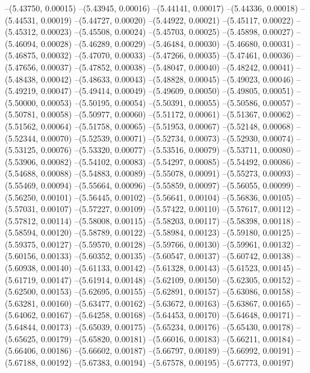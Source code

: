 --(5.43750, 0.00015)
--(5.43945, 0.00016)
--(5.44141, 0.00017)
--(5.44336, 0.00018)
--(5.44531, 0.00019)
--(5.44727, 0.00020)
--(5.44922, 0.00021)
--(5.45117, 0.00022)
--(5.45312, 0.00023)
--(5.45508, 0.00024)
--(5.45703, 0.00025)
--(5.45898, 0.00027)
--(5.46094, 0.00028)
--(5.46289, 0.00029)
--(5.46484, 0.00030)
--(5.46680, 0.00031)
--(5.46875, 0.00032)
--(5.47070, 0.00033)
--(5.47266, 0.00035)
--(5.47461, 0.00036)
--(5.47656, 0.00037)
--(5.47852, 0.00038)
--(5.48047, 0.00040)
--(5.48242, 0.00041)
--(5.48438, 0.00042)
--(5.48633, 0.00043)
--(5.48828, 0.00045)
--(5.49023, 0.00046)
--(5.49219, 0.00047)
--(5.49414, 0.00049)
--(5.49609, 0.00050)
--(5.49805, 0.00051)
--(5.50000, 0.00053)
--(5.50195, 0.00054)
--(5.50391, 0.00055)
--(5.50586, 0.00057)
--(5.50781, 0.00058)
--(5.50977, 0.00060)
--(5.51172, 0.00061)
--(5.51367, 0.00062)
--(5.51562, 0.00064)
--(5.51758, 0.00065)
--(5.51953, 0.00067)
--(5.52148, 0.00068)
--(5.52344, 0.00070)
--(5.52539, 0.00071)
--(5.52734, 0.00073)
--(5.52930, 0.00074)
--(5.53125, 0.00076)
--(5.53320, 0.00077)
--(5.53516, 0.00079)
--(5.53711, 0.00080)
--(5.53906, 0.00082)
--(5.54102, 0.00083)
--(5.54297, 0.00085)
--(5.54492, 0.00086)
--(5.54688, 0.00088)
--(5.54883, 0.00089)
--(5.55078, 0.00091)
--(5.55273, 0.00093)
--(5.55469, 0.00094)
--(5.55664, 0.00096)
--(5.55859, 0.00097)
--(5.56055, 0.00099)
--(5.56250, 0.00101)
--(5.56445, 0.00102)
--(5.56641, 0.00104)
--(5.56836, 0.00105)
--(5.57031, 0.00107)
--(5.57227, 0.00109)
--(5.57422, 0.00110)
--(5.57617, 0.00112)
--(5.57812, 0.00114)
--(5.58008, 0.00115)
--(5.58203, 0.00117)
--(5.58398, 0.00118)
--(5.58594, 0.00120)
--(5.58789, 0.00122)
--(5.58984, 0.00123)
--(5.59180, 0.00125)
--(5.59375, 0.00127)
--(5.59570, 0.00128)
--(5.59766, 0.00130)
--(5.59961, 0.00132)
--(5.60156, 0.00133)
--(5.60352, 0.00135)
--(5.60547, 0.00137)
--(5.60742, 0.00138)
--(5.60938, 0.00140)
--(5.61133, 0.00142)
--(5.61328, 0.00143)
--(5.61523, 0.00145)
--(5.61719, 0.00147)
--(5.61914, 0.00148)
--(5.62109, 0.00150)
--(5.62305, 0.00152)
--(5.62500, 0.00153)
--(5.62695, 0.00155)
--(5.62891, 0.00157)
--(5.63086, 0.00158)
--(5.63281, 0.00160)
--(5.63477, 0.00162)
--(5.63672, 0.00163)
--(5.63867, 0.00165)
--(5.64062, 0.00167)
--(5.64258, 0.00168)
--(5.64453, 0.00170)
--(5.64648, 0.00171)
--(5.64844, 0.00173)
--(5.65039, 0.00175)
--(5.65234, 0.00176)
--(5.65430, 0.00178)
--(5.65625, 0.00179)
--(5.65820, 0.00181)
--(5.66016, 0.00183)
--(5.66211, 0.00184)
--(5.66406, 0.00186)
--(5.66602, 0.00187)
--(5.66797, 0.00189)
--(5.66992, 0.00191)
--(5.67188, 0.00192)
--(5.67383, 0.00194)
--(5.67578, 0.00195)
--(5.67773, 0.00197)
